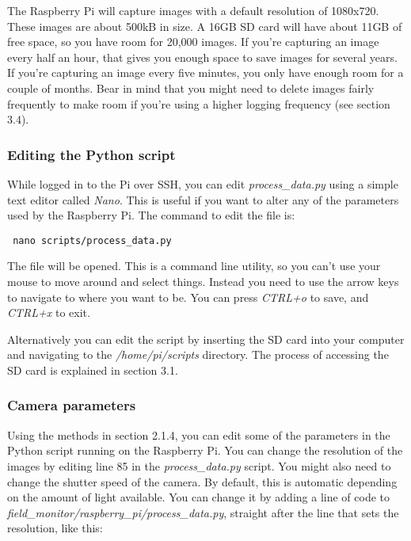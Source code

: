 \documentclass[10pt]{article}
\begin{document}
The Raspberry Pi will capture images with a default resolution of 1080x720. These images are about 500kB in size. A 16GB SD card will have about 11GB of free space, so you have room for 20,000 images. If you're capturing an image every half an hour, that gives you enough space to save images for several years. If you're capturing an image every five minutes, you only have enough room for a couple of months. Bear in mind that you might need to delete images fairly frequently to make room if you're using a higher logging frequency (see section 3.4).

\subsubsection{Editing the Python script}

While logged in to the Pi over SSH, you can edit \textit{process\_data.py} using a simple text editor called \textit{Nano}. This is useful if you want to alter any of the parameters used by the Raspberry Pi. The command to edit the file is:

\begin{verbatim}
 nano scripts/process_data.py
\end{verbatim}

The file will be opened. This is a command line utility, so you can't use your mouse to move around and select things. Instead you need to use the arrow keys to navigate to where you want to be. You can press \textit{CTRL+o} to save, and \textit{CTRL+x} to exit.

Alternatively you can edit the script by inserting the SD card into your computer and navigating to the \textit{/home/pi/scripts} directory. The process of accessing the SD card is explained in section 3.1.

\subsubsection{Camera parameters}

Using the methods in section 2.1.4, you can edit some of the parameters in the Python script running on the Raspberry Pi. You can change the resolution of the images by editing line 85 in the \textit{process\_data.py} script. You might also need to change the shutter speed of the camera. By default, this is automatic depending on the amount of light available. You can change it by adding a line of code to \textit{field\_monitor/raspberry\_pi/process\_data.py}, straight after the line that sets the resolution, like this:
\end{document}
